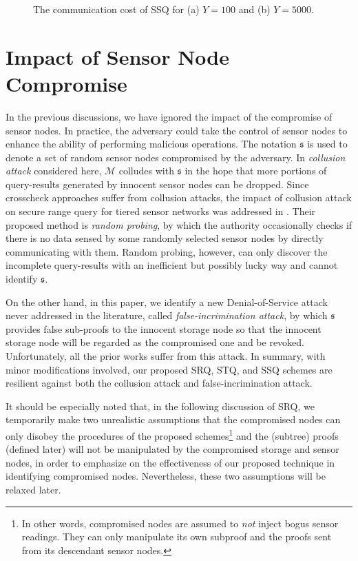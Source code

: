 \documentclass[conference]{IEEEtran}
\begin{document}
\begin{figure}[h]
\centering
{}
\caption{\scriptsize The communication cost of SSQ for (a) $Y=100$ and (b) $Y=5000$.} \label{fig: SSQ communication cost}
\end{figure}

\section{Impact of Sensor Node Compromise}\label{sec: Impact of Sensor Node Compromise}
In the previous discussions, we have ignored the impact of the compromise of sensor nodes. In practice, the adversary could take the control of sensor nodes to enhance the ability of performing malicious operations. The notation $\mathfrak{s}$ is used to denote a set of random sensor nodes compromised by the adversary. In \emph{collusion attack} considered here, $\mathcal{M}$ colludes with $\mathfrak{s}$ in the hope that more portions of query-results generated by innocent sensor nodes can be dropped. Since crosscheck approaches \cite{zsz09} suffer from collusion attacks, the impact of collusion attack on secure range query for tiered sensor networks was addressed in \cite{zsz09}. Their proposed method is \emph{random probing}, by which the authority occasionally checks if there is no data sensed by some randomly selected sensor nodes by directly communicating with them. Random probing, however, can only discover the incomplete query-results with an inefficient but possibly lucky way and cannot identify $\mathfrak{s}$.

On the other hand, in this paper, we identify a new Denial-of-Service attack never addressed in the literature, called \emph{false-incrimination attack}, by which $\mathfrak{s}$ provides false sub-proofs to the innocent storage node so that the innocent storage node will be regarded as the compromised one and be revoked. Unfortunately, all the prior works \cite{sl08,szz09,zsz09} suffer from this attack. In summary, with minor modifications involved, our proposed SRQ, STQ, and SSQ schemes are resilient against both the collusion attack and false-incrimination attack.

It should be especially noted that, in the following discussion of SRQ, we temporarily make two unrealistic assumptions that the compromised nodes can only disobey the procedures of the proposed schemes\footnote{In other words, compromised nodes are assumed to \emph{not} inject bogus sensor readings. They can only manipulate its own subproof and the proofs sent from its descendant sensor nodes.} and the (subtree) proofs (defined later) will not be manipulated by the compromised storage and sensor nodes, in order to emphasize on the effectiveness of our proposed technique in identifying compromised nodes. Nevertheless, these two assumptions will be relaxed later.
\end{document}
